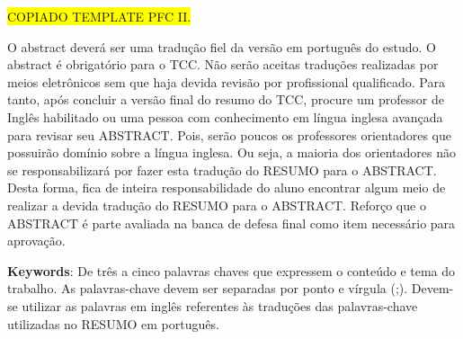 
\begin{resumo}[ABSTRACT]

\colorbox{yellow}{COPIADO TEMPLATE PFC II.}

O abstract deverá ser uma tradução fiel da versão em português do estudo. O abstract é obrigatório para o TCC. Não serão aceitas traduções realizadas por meios eletrônicos sem que haja devida revisão por profissional qualificado. Para tanto, após concluir a versão final do resumo do TCC, procure um professor de Inglês habilitado ou uma pessoa com conhecimento em língua inglesa avançada para revisar seu ABSTRACT. Pois, serão poucos os professores orientadores que possuirão domínio sobre a língua inglesa. Ou seja, a maioria dos orientadores não se responsabilizará por fazer esta tradução do RESUMO para o ABSTRACT. Desta forma, fica de inteira responsabilidade do aluno encontrar algum meio de realizar a devida tradução do RESUMO para o ABSTRACT. Reforço que o ABSTRACT é parte avaliada na banca de defesa final como item necessário para aprovação. 

    \par\vspace{\baselineskip}

    \textbf{Keywords}: De três a cinco palavras chaves que expressem o conteúdo e tema do trabalho. As palavras-chave devem ser separadas por ponto e vírgula (;). Devem-se utilizar as palavras em inglês referentes às traduções das palavras-chave utilizadas no RESUMO em português.


\end{resumo}

